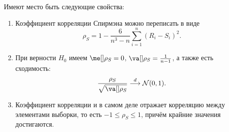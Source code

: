 \begin{theorem}{}{}
Имеют место быть следующие свойства:
\begin{enumerate}
    \item Коэффициент корреляции Спирмэна можно переписать в виде
    \[
    \rho_S = 1 - \frac{6}{n^3-n} \sum_{i=1}^n (R_i - S_i)^2.
    \]
    \item При верности $H_0$ имеем $\me[]\rho_S = 0$, $\va[] \rho_S = \frac{1}{n-1}$, а также есть сходимость:
    \[
    \frac{\rho_S}{\sqrt{\va[] \rho_S}} \stackrel{d}{\longrightarrow} \mathcal{N}(0, 1).
    \]
    \item Коэффициент корреляции и в самом деле отражает корреляцию между элементами выборки, то есть $-1 \le \rho_S \le 1$, причём крайние значения достигаются.
\end{enumerate}
\end{theorem}
